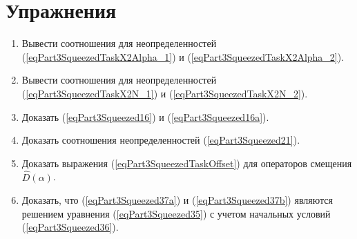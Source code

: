 \section{Упражнения}
\begin{enumerate}
\item Вывести соотношения для неопределенностей
  (\ref{eqPart3SqueezedTaskX2Alpha_1}) и
  (\ref{eqPart3SqueezedTaskX2Alpha_2}).
\item Вывести соотношения для неопределенностей
  (\ref{eqPart3SqueezedTaskX2N_1}) и
  (\ref{eqPart3SqueezedTaskX2N_2}).
\item Доказать (\ref{eqPart3Squeezed16}) и
  (\ref{eqPart3Squeezed16a}). 
\item Доказать соотношения неопределенностей
  (\ref{eqPart3Squeezed21}). 
\item Доказать выражения (\ref{eqPart3SqueezedTaskOffset}) для
  операторов смещения $\hat{D}\left(\alpha\right)$.
\item Доказать, что (\ref{eqPart3Squeezed37a}) и
  (\ref{eqPart3Squeezed37b}) являются решением 
  уравнения (\ref{eqPart3Squeezed35}) с учетом начальных
  условий (\ref{eqPart3Squeezed36}).
\end{enumerate}
